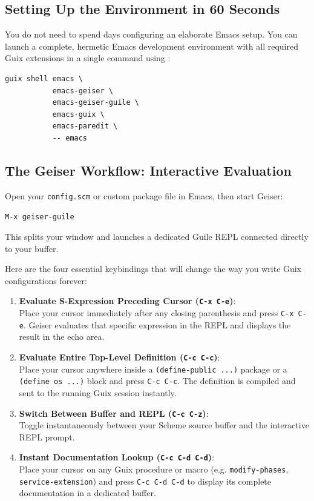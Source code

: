 \subsection{Setting Up the Environment in 60 Seconds}

You do not need to spend days configuring an elaborate Emacs setup. You can launch a complete, hermetic Emacs development environment with all required Guix extensions in a single command using :

\begin{lstlisting}[style=guixcli]
guix shell emacs \
           emacs-geiser \
           emacs-geiser-guile \
           emacs-guix \
           emacs-paredit \
           -- emacs
\end{lstlisting}

\subsection{The Geiser Workflow: Interactive Evaluation}

Open your \texttt{config.scm} or custom package file in Emacs, then start Geiser:
\begin{center}
\texttt{M-x geiser-guile}
\end{center}
This splits your window and launches a dedicated Guile REPL connected directly to your buffer.

Here are the four essential keybindings that will change the way you write Guix configurations forever:

\begin{enumerate}
  \item \textbf{Evaluate S-Expression Preceding Cursor (\texttt{C-x C-e})}:\\
    Place your cursor immediately after any closing parenthesis and press \texttt{C-x C-e}. Geiser evaluates that specific expression in the REPL and displays the result in the echo area.
  
  \item \textbf{Evaluate Entire Top-Level Definition (\texttt{C-c C-c})}:\\
    Place your cursor anywhere inside a \texttt{(define-public ...)} package or a \texttt{(define os ...)} block and press \texttt{C-c C-c}. The definition is compiled and sent to the running Guix session instantly.

  \item \textbf{Switch Between Buffer and REPL (\texttt{C-c C-z})}:\\
    Toggle instantaneously between your Scheme source buffer and the interactive REPL prompt.

  \item \textbf{Instant Documentation Lookup (\texttt{C-c C-d C-d})}:\\
    Place your cursor on any Guix procedure or macro (e.g. \texttt{modify-phases}, \texttt{service-extension}) and press \texttt{C-c C-d C-d} to display its complete documentation in a dedicated buffer.
\end{enumerate}

